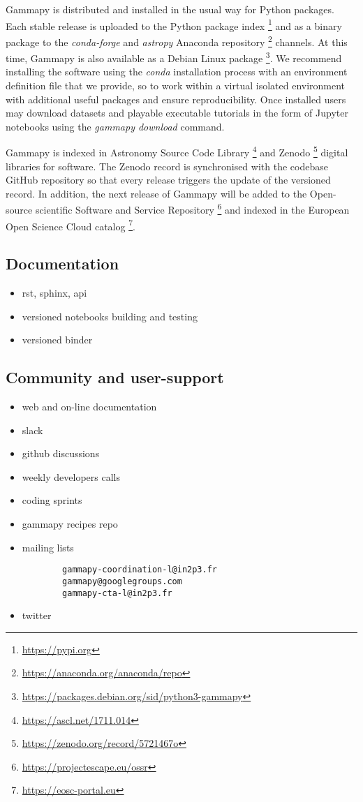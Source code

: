 Gammapy is distributed and installed in the usual way for Python packages. Each stable release is uploaded to the Python package index \footnote{\url{https://pypi.org}} and as a binary package to the \textit{conda-forge} and \textit{astropy} Anaconda repository \footnote{\url{https://anaconda.org/anaconda/repo}} channels. At this time, Gammapy is also available as a Debian Linux package \footnote{\url{https://packages.debian.org/sid/python3-gammapy}}. We recommend installing the software using the \textit{conda} installation process with an environment definition file that we provide, so to work within a virtual isolated environment with additional useful packages and ensure reproducibility. Once installed users may download datasets and playable executable tutorials in the form of Jupyter notebooks using the \textit{gammapy download} command.

Gammapy is indexed in Astronomy Source Code Library \footnote{\url{https://ascl.net/1711.014}} and Zenodo \footnote{\url{https://zenodo.org/record/5721467o}} digital libraries for software. The Zenodo record is synchronised with the codebase GitHub repository so that every release triggers the update of the versioned record. In addition, the next release of Gammapy will be added to the Open-source scientific Software and Service Repository \footnote{\url{https://projectescape.eu/ossr}} and indexed in the European Open Science Cloud catalog \footnote{\url{https://eosc-portal.eu}}.

\subsection{Documentation}
\label{ssec:documentation}

\begin{itemize}
	\item rst, sphinx, api
	\item versioned notebooks building and testing
	\item versioned binder
\end{itemize}

\subsection{Community and user-support}
\label{ssec:community-and-user-support}

\begin{itemize}
	\item web and on-line documentation 	
	\item slack
	\item github discussions
	\item weekly developers calls
	\item coding sprints 
	\item gammapy recipes repo
	\item mailing lists 
		\begin{verbatim}
		gammapy-coordination-l@in2p3.fr 
		gammapy@googlegroups.com 
		gammapy-cta-l@in2p3.fr
		\end{verbatim}
	\item twitter
\end{itemize}

